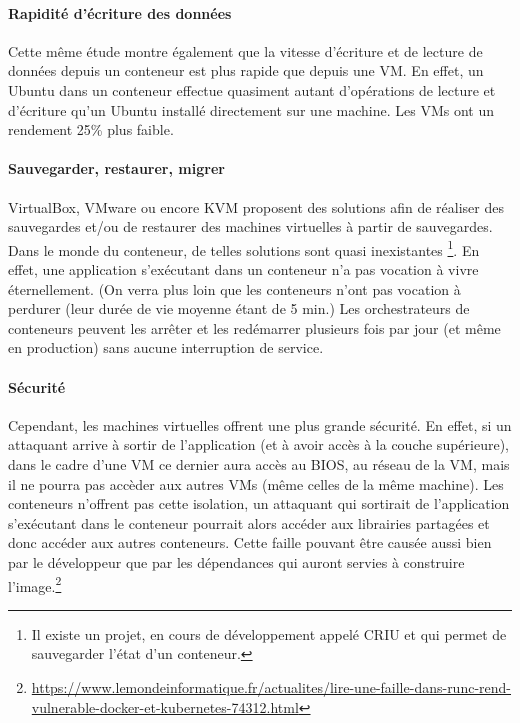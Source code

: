 \documentclass[11pt,fleqn]{book} %
\begin{document}
\paragraph{Rapidité d'écriture des données}
Cette même étude montre également que la vitesse d'écriture et de lecture de données depuis un conteneur est plus rapide que depuis une VM. En effet, un Ubuntu dans un conteneur effectue quasiment autant d'opérations de lecture et d'écriture qu'un Ubuntu installé directement sur une machine. Les VMs ont un rendement 25\% plus faible. 

\paragraph{Sauvegarder, restaurer, migrer}
VirtualBox, VMware ou encore KVM proposent des solutions afin de réaliser des sauvegardes et/ou de restaurer des machines virtuelles à partir de sauvegardes. Dans le monde du conteneur, de telles solutions sont quasi inexistantes \footnote{Il existe un projet, en cours de développement appelé CRIU et qui permet de sauvegarder l'état d'un conteneur.}. En effet, une application s'exécutant dans un conteneur n'a pas vocation à vivre éternellement. (On verra plus loin que les conteneurs n'ont pas vocation à perdurer (leur durée de vie moyenne étant de 5 min.) Les orchestrateurs de conteneurs peuvent les arrêter et les redémarrer plusieurs fois par jour (et même en production) sans aucune interruption de service.

\paragraph{Sécurité}
Cependant, les machines virtuelles offrent une plus grande sécurité. En effet, si un attaquant arrive à sortir de l'application (et à avoir accès à la couche supérieure), dans le cadre d'une VM ce dernier aura accès au BIOS, au réseau de la VM, mais il ne pourra pas accèder aux autres VMs (même celles de la même machine). Les conteneurs n'offrent pas cette isolation, un attaquant qui sortirait de l'application s'exécutant dans le conteneur pourrait alors accéder aux librairies partagées et donc accéder aux autres conteneurs. Cette faille pouvant être causée aussi bien par le développeur que par les dépendances qui auront servies à construire l'image.\footnote{\url{https://www.lemondeinformatique.fr/actualites/lire-une-faille-dans-runc-rend-vulnerable-docker-et-kubernetes-74312.html}} 
\end{document}
